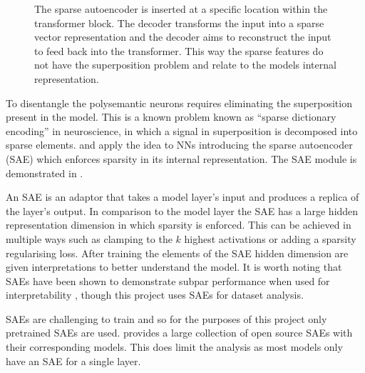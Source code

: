 \begin{figure}
    \centering
    \captionsetup{width=.9\textwidth}
    
    \caption{The sparse autoencoder is inserted at a specific location within the transformer block. The decoder transforms the input into a sparse vector representation and the decoder aims to reconstruct the input to feed back into the transformer. This way the sparse features do not have the superposition problem and relate to the models internal representation.}
    \label{fig:sae}
\end{figure}

To disentangle the polysemantic neurons requires eliminating the superposition present in the model.
This is a known problem known as ``sparse dictionary encoding'' \citep{sparse-coding} in neuroscience, in which a signal in superposition is decomposed into sparse elements.
\citet{sae-orig} and \citet{saes} apply the idea to NNs introducing the sparse autoencoder (SAE) which enforces sparsity in its internal representation.
The SAE module is demonstrated in .

An SAE is an adaptor that takes a model layer's input and produces a replica of the layer's output.
In comparison to the model layer the SAE has a large hidden representation dimension in which sparsity is enforced.
This can be achieved in multiple ways such as clamping to the $k$ highest activations \citep{k-sparsity} or adding a sparsity regularising loss.
After training the elements of the SAE hidden dimension are given interpretations to better understand the model.
It is worth noting that SAEs have been shown to demonstrate subpar performance when used for interpretability \citep{saes-bad}, though this project uses SAEs for dataset analysis.

SAEs are challenging to train and so for the purposes of this project only pretrained SAEs are used.
\citet{saelens} provides a large collection of open source SAEs with their corresponding models.
This does limit the analysis as most models only have an SAE for a single layer.
